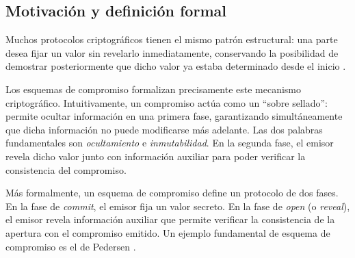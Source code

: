 
\subsection{Motivación y definición formal}
\label{subsec:apendice-b-commitment-schemes-motivacion-y-definicion-formal}

Muchos protocolos criptográficos tienen el mismo patrón estructural: una parte desea fijar un valor sin revelarlo inmediatamente, conservando la posibilidad de demostrar posteriormente que dicho valor ya estaba determinado desde el inicio \cite{hac,katz}.

Los esquemas de compromiso formalizan precisamente este mecanismo criptográfico. Intuitivamente, un compromiso actúa como un “sobre sellado”: permite ocultar información en una primera fase, garantizando simultáneamente que dicha información no puede modificarse más adelante. Las dos palabras fundamentales son \emph{ocultamiento} e \emph{inmutabilidad}. En la segunda fase, el emisor revela dicho valor junto con información auxiliar para poder verificar la consistencia del compromiso.

Más formalmente, un esquema de compromiso define un protocolo de dos fases. En la fase de \textit{commit}, el emisor fija un valor secreto. En la fase de \textit{open} (o \textit{reveal}), el emisor revela información auxiliar que permite verificar la consistencia de la apertura con el compromiso emitido. Un ejemplo fundamental de esquema de compromiso es el de Pedersen \cite{Pedersen}.

